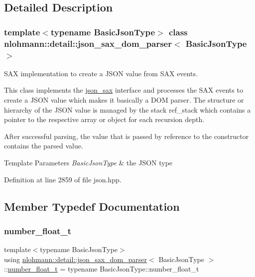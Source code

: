 \subsection{Detailed Description}
\subsubsection*{template$<$typename Basic\+Json\+Type$>$\newline
class nlohmann\+::detail\+::json\+\_\+sax\+\_\+dom\+\_\+parser$<$ Basic\+Json\+Type $>$}

S\+AX implementation to create a J\+S\+ON value from S\+AX events. 

This class implements the \mbox{\hyperlink{structnlohmann_1_1json__sax}{json\+\_\+sax}} interface and processes the S\+AX events to create a J\+S\+ON value which makes it basically a D\+OM parser. The structure or hierarchy of the J\+S\+ON value is managed by the stack {\ttfamily ref\+\_\+stack} which contains a pointer to the respective array or object for each recursion depth.

After successful parsing, the value that is passed by reference to the constructor contains the parsed value.


\begin{DoxyTemplParams}{Template Parameters}
{\em Basic\+Json\+Type} & the J\+S\+ON type \\
\hline
\end{DoxyTemplParams}


Definition at line 2859 of file json.\+hpp.



\subsection{Member Typedef Documentation}
\mbox{\label{classnlohmann_1_1detail_1_1json__sax__dom__parser_ad8da3aad0147b18b3cb76868480300fe}} 
\subsubsection{\texorpdfstring{number\_float\_t}{number\_float\_t}}
{\footnotesize\ttfamily template$<$typename Basic\+Json\+Type$>$ \\
using \mbox{\hyperlink{classnlohmann_1_1detail_1_1json__sax__dom__parser}{nlohmann\+::detail\+::json\+\_\+sax\+\_\+dom\+\_\+parser}}$<$ Basic\+Json\+Type $>$\+::\mbox{\hyperlink{classnlohmann_1_1detail_1_1json__sax__dom__parser_ad8da3aad0147b18b3cb76868480300fe}{number\+\_\+float\+\_\+t}} =  typename Basic\+Json\+Type\+::number\+\_\+float\+\_\+t}



